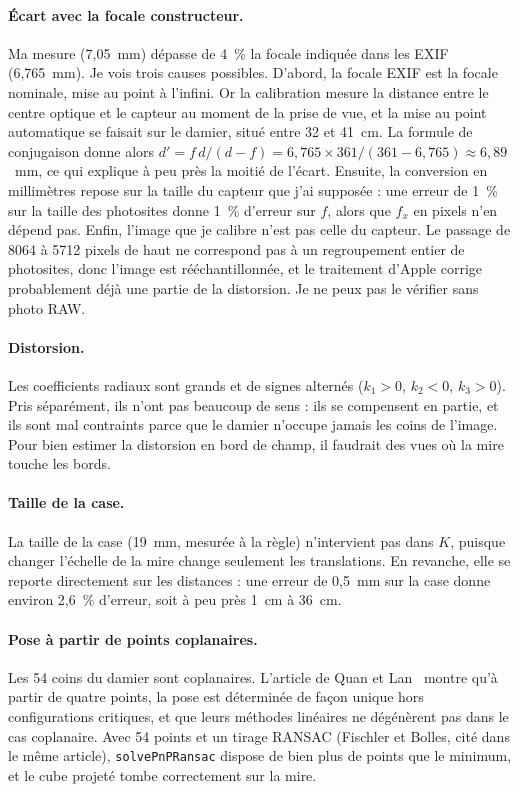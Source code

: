 \documentclass[11pt,a4paper]{article}
\begin{document}
\paragraph{Écart avec la focale constructeur.} Ma mesure (7,05~mm) dépasse de 4~\% la focale indiquée dans les EXIF (6,765~mm). Je vois trois causes possibles. D'abord, la focale EXIF est la focale nominale, mise au point à l'infini. Or la calibration mesure la distance entre le centre optique et le capteur au moment de la prise de vue, et la mise au point automatique se faisait sur le damier, situé entre 32 et 41~cm. La formule de conjugaison donne alors $d' = f\,d/(d-f) = 6{,}765 \times 361/(361-6{,}765) \approx 6{,}89$~mm, ce qui explique à peu près la moitié de l'écart. Ensuite, la conversion en millimètres repose sur la taille du capteur que j'ai supposée : une erreur de 1~\% sur la taille des photosites donne 1~\% d'erreur sur $f$, alors que $f_x$ en pixels n'en dépend pas. Enfin, l'image que je calibre n'est pas celle du capteur. Le passage de 8064 à 5712 pixels de haut ne correspond pas à un regroupement entier de photosites, donc l'image est rééchantillonnée, et le traitement d'Apple corrige probablement déjà une partie de la distorsion. Je ne peux pas le vérifier sans photo RAW.

\paragraph{Distorsion.} Les coefficients radiaux sont grands et de signes alternés ($k_1>0$, $k_2<0$, $k_3>0$). Pris séparément, ils n'ont pas beaucoup de sens : ils se compensent en partie, et ils sont mal contraints parce que le damier n'occupe jamais les coins de l'image. Pour bien estimer la distorsion en bord de champ, il faudrait des vues où la mire touche les bords.

\paragraph{Taille de la case.} La taille de la case (19~mm, mesurée à la règle) n'intervient pas dans $K$, puisque changer l'échelle de la mire change seulement les translations. En revanche, elle se reporte directement sur les distances : une erreur de 0,5~mm sur la case donne environ 2,6~\% d'erreur, soit à peu près 1~cm à 36~cm.

\paragraph{Pose à partir de points coplanaires.} Les 54 coins du damier sont coplanaires. L'article de Quan et Lan~\cite{quan} montre qu'à partir de quatre points, la pose est déterminée de façon unique hors configurations critiques, et que leurs méthodes linéaires ne dégénèrent pas dans le cas coplanaire. Avec 54 points et un tirage RANSAC (Fischler et Bolles, cité dans le même article), \texttt{solvePnPRansac} dispose de bien plus de points que le minimum, et le cube projeté tombe correctement sur la mire.
\end{document}
